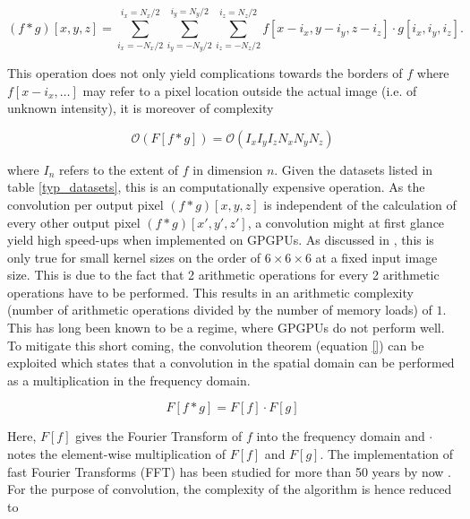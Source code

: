 \begin{equation}
  \label{eq:disc_convolve}
  (f \ast g)[x,y,z] = \sum^{i_x = N_{x}/2}_{i_x = -N_{x}/2} \sum^{i_y = N_{y}/2}_{i_y = -N_{y}/2} \sum^{i_z = N_{z}/2}_{i_z = -N_{z}/2} f[x-i_x,y-i_y,z-i_z] \cdot g[i_x,i_y,i_z].
\end{equation}

This operation does not only yield complications towards the borders of $f$ where $f[x-i_x,\dots]$ may refer to a pixel location outside the actual image (i.e. of unknown intensity), it is moreover of complexity 

\begin{equation}
\label{eq:discrete_convol_complexity}
\mathcal{O}(F[f \ast g]) = \mathcal{O}(I_{x} I_{y} I_{z} N_{x} N_{y} N_{z})
\end{equation}


where $I_{n}$ refers to the extent of $f$ in dimension $n$. Given the datasets listed in table \ref{typ_datasets}, this is an computationally expensive operation. As the convolution per output pixel $(f \ast g)[x,y,z]$ is independent of the calculation of every other output pixel $(f \ast g)[x',y',z']$, a convolution might at first glance yield high speed-ups when implemented on GPGPUs. As discussed in \cite{eklund_nonseparable_filtering}, this is only true for small kernel sizes on the order of $6 \times 6 \times 6$ at a fixed input image size. This is due to the fact that 2 arithmetic operations for every 2 arithmetic operations have to be performed. This results in an arithmetic complexity (number of arithmetic operations divided by the number of memory loads) of $1$. This has long been known \cite{massively_parallel_book} to be a regime, where GPGPUs do not perform well. To mitigate this short coming, the convolution theorem (equation \ref{}) can be exploited which states that a convolution in the spatial domain can be performed as a multiplication in the frequency domain.

\begin{equation}
  \label{eq:convol_theorem}
  F[f \ast g] = F[f] \cdot F[g]
\end{equation}

Here, $F[f]$ gives the Fourier Transform of $f$ into the frequency domain and $\cdot$ notes the element-wise multiplication of $F[f]$ and $F[g]$. The implementation of fast Fourier Transforms (FFT) has been studied for more than 50 years by now \cite{FFTCooleyTurkey,FFTBluestein,FFTRaders}. For the purpose of convolution, the complexity of the algorithm is hence reduced to 


